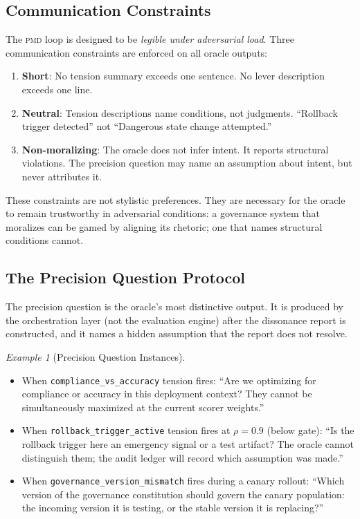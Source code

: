 \documentclass[11pt,letterpaper]{article}
\theoremstyle{remark}
\newtheorem{example}[theorem]{Example}
\newcommand{\pmd}{\textsc{pmd}}
\newcommand{\rhosys}{\rho}
\begin{document}
\subsection{Communication Constraints}

The \pmd{} loop is designed to be \emph{legible under adversarial load}.
Three communication constraints are enforced on all oracle outputs:

\begin{enumerate}[leftmargin=1.5em]
  \item \textbf{Short}: No tension summary exceeds one sentence.
        No lever description exceeds one line.
  \item \textbf{Neutral}: Tension descriptions name conditions, not
        judgments.  ``Rollback trigger detected'' not ``Dangerous state
        change attempted.''
  \item \textbf{Non-moralizing}: The oracle does not infer intent.
        It reports structural violations.  The precision question
        may name an assumption about intent, but never attributes it.
\end{enumerate}

These constraints are not stylistic preferences.  They are necessary for
the oracle to remain trustworthy in adversarial conditions: a governance
system that moralizes can be gamed by aligning its rhetoric; one that
names structural conditions cannot.

\subsection{The Precision Question Protocol}

The precision question is the oracle's most distinctive output.  It is
produced by the orchestration layer (not the evaluation engine) after
the dissonance report is constructed, and it names a hidden assumption
that the report does not resolve.

\begin{example}[Precision Question Instances]
\label{ex:precision}
\begin{itemize}[leftmargin=1.5em]
  \item When \texttt{compliance\_vs\_accuracy} tension fires:
        ``Are we optimizing for compliance or accuracy in this deployment
        context?  They cannot be simultaneously maximized at the current
        scorer weights.''
  \item When \texttt{rollback\_trigger\_active} tension fires at $\rhosys = 0.9$
        (below gate):
        ``Is the rollback trigger here an emergency signal or a test artifact?
        The oracle cannot distinguish them; the audit ledger will record which
        assumption was made.''
  \item When \texttt{governance\_version\_mismatch} fires during a canary
        rollout: ``Which version of the governance constitution should govern
        the canary population: the incoming version it is testing, or the
        stable version it is replacing?''
\end{itemize}
\end{example}
\end{document}
